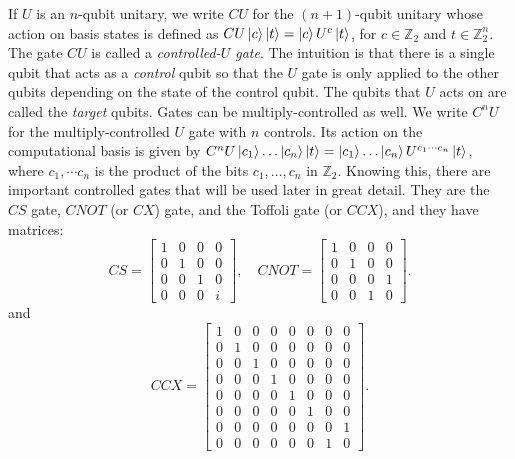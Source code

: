 \documentclass[12pt]{dalthesis}
\begin{document}
If $U$ is an $n$-qubit unitary, we write $CU$ for the $(n+1)$-qubit unitary whose action on basis states is defined as $CU\ket{c}\ket{t} = \ket{c}U^c\ket{t}$, for $c \in \mathbb{Z}_2$ and $t \in \mathbb{Z}_2^n$. The gate $CU$ is called a \emph{controlled-$U$ gate}. The intuition is that there is a single qubit that acts as a \emph{control} qubit so that the $U$ gate is only applied to the other qubits depending on the state of the control qubit. The qubits that $U$ acts on are called the \emph{target} qubits. Gates can be multiply-controlled as well. We write $C^nU$ for the multiply-controlled $U$ gate with $n$ controls. Its action on the computational basis is given by $C^nU\ket{c_1}\ldots \ket{c_n}\ket{t} = \ket{c_1}\ldots \ket{c_n}U^{c_1\cdots c_n} \ket{t}$, where $c_1, \cdots c_n$ is the product of the bits $c_1, \ldots , c_n$ in $\mathbb{Z}_2$. Knowing this, there are important controlled gates that will be used later in great detail. They are the $CS$ gate, $CNOT$ (or $CX$) gate, and the Toffoli gate (or $CCX$), and they have matrices:
\begin{equation*}
  CS = \begin{bmatrix}
  1 & 0 & 0 & 0 \\
  0 & 1 & 0 & 0 \\
  0 & 0 & 1 & 0 \\
  0 & 0 & 0 & i
  \end{bmatrix}, \quad
  CNOT = \begin{bmatrix}
  1 & 0 & 0 & 0 \\
  0 & 1 & 0 & 0 \\
  0 & 0 & 0 & 1 \\
  0 & 0 & 1 & 0 
  \end{bmatrix}.
\end{equation*}
and 
\begin{equation*}
  CCX = \begin{bmatrix}
  1 & 0 & 0 & 0 & 0 & 0 & 0 & 0 \\
  0 & 1 & 0 & 0 & 0 & 0 & 0 & 0 \\
  0 & 0 & 1 & 0 & 0 & 0 & 0 & 0 \\
  0 & 0 & 0 & 1 & 0 & 0 & 0 & 0 \\
  0 & 0 & 0 & 0 & 1 & 0 & 0 & 0 \\
  0 & 0 & 0 & 0 & 0 & 1 & 0 & 0 \\
  0 & 0 & 0 & 0 & 0 & 0 & 0 & 1 \\
  0 & 0 & 0 & 0 & 0 & 0 & 1 & 0 
  \end{bmatrix}.
\end{equation*}
\end{document}
